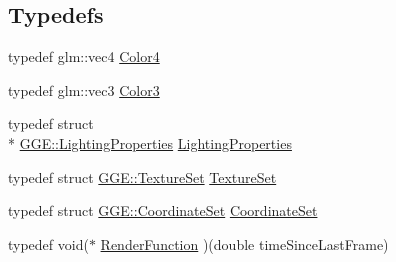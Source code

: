 \subsection*{Typedefs}
\begin{DoxyCompactItemize}
\item 
typedef glm\+::vec4 \hyperlink{namespace_g_g_e_aff43741fd756c83cbfd5d4d5cd9fcf41}{Color4}
\item 
typedef glm\+::vec3 \hyperlink{namespace_g_g_e_ae2829723f010eeffbb96282f99792546}{Color3}
\item 
typedef struct \\*
\hyperlink{struct_g_g_e_1_1_lighting_properties}{G\+G\+E\+::\+Lighting\+Properties} \hyperlink{namespace_g_g_e_a3cb8bb0b982d877997c93103c48e2592}{Lighting\+Properties}
\item 
typedef struct \hyperlink{struct_g_g_e_1_1_texture_set}{G\+G\+E\+::\+Texture\+Set} \hyperlink{namespace_g_g_e_ac7a8b0e1f9b7fdd11002ac1259a61278}{Texture\+Set}
\item 
typedef struct \hyperlink{struct_g_g_e_1_1_coordinate_set}{G\+G\+E\+::\+Coordinate\+Set} \hyperlink{namespace_g_g_e_a7e11417ae8ffddb46f0338f25ebf2051}{Coordinate\+Set}
\item 
typedef void($\ast$ \hyperlink{namespace_g_g_e_ae2d6bfdcdfc2e210b6d827b4221a9dc4}{Render\+Function} )(double time\+Since\+Last\+Frame)
\end{DoxyCompactItemize}

